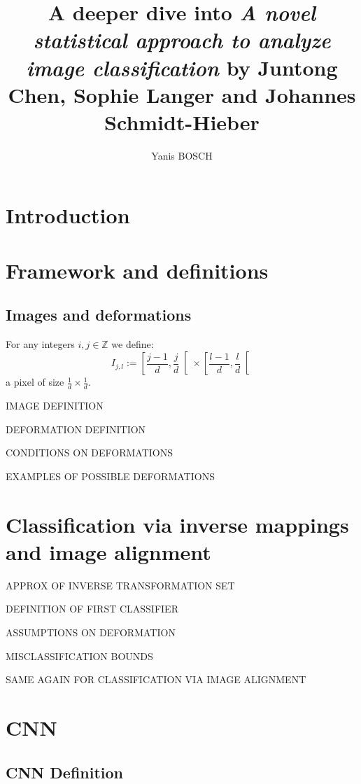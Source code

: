 \documentclass{article}
\theoremstyle{definition}
\theoremstyle{remark}
\theoremstyle{proposition}
\begin{document}
	\title{A deeper dive into \textit{A novel statistical approach to analyze image classification} by Juntong Chen, Sophie Langer and Johannes Schmidt-Hieber}
	\author{Yanis \textsc{BOSCH}}
	\maketitle
	\newpage
	\tableofcontents
	\newpage
	\section{Introduction}
        \section{Framework and definitions}
            \subsection{Images and deformations}
            For any integers $i,j \in \mathbb{Z}$ we define:
            \[
                I_{j,l} := \left[ \frac{j-1}{d},\frac{j}{d} \right[ \times \left[ \frac{l-1}{d},\frac{l}{d} \right[
            \]
            a pixel of size $\frac{1}{d}\times \frac{1}{d}$.

            IMAGE DEFINITION

            DEFORMATION DEFINITION

            CONDITIONS ON DEFORMATIONS

            EXAMPLES OF POSSIBLE DEFORMATIONS
        \section{Classification via inverse mappings and image alignment}

        APPROX OF INVERSE TRANSFORMATION SET

        DEFINITION OF FIRST CLASSIFIER

        ASSUMPTIONS ON DEFORMATION

        MISCLASSIFICATION BOUNDS 

        SAME AGAIN FOR CLASSIFICATION VIA IMAGE ALIGNMENT
        
        \section{CNN}
        \subsection{CNN Definition}
\end{document}

